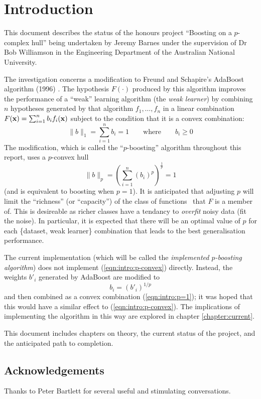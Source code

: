 

\chapter{Introduction}
\label{chapter:intro}

This document describes the status of the honours project
``Boosting on a $p$-complex hull'' being undertaken by Jeremy
Barnes under the supervision of Dr Bob Williamson in the
Engineering Department of the Australian National University.

The investigation concerns a modification to Freund and Schapire's
AdaBoost algorithm (1996) \cite{Freund96}.  The hypothesis $F(\cdot)$
produced by this algorithm improves the performance of a ``weak''
learning algorithm (the \emph{weak learner}) by combining $n$
hypotheses generated by that algorithm $f_1, \ldots, f_n$
in a linear combination $F(\mathbf{x}) = \sum_{i=1}^{n} b_i f_i(\mathbf{x})$
subject to the condition that it is a convex combination:
%
\begin{equation}
\label{eqn:intro:p=1}
\|b\|_1 = \sum_{i=1}^{n} b_i = 1 \qquad \mbox{where} \qquad b_i \geq 0
\end{equation}
%
The modification, which is called the ``$p$-boosting'' algorithm
throughout this report, uses a $p$-convex hull
%
\begin{equation}
\|b\|_p = \left( \sum_{i=1}^{n} \left(b_i\right)^p
\right)^{\frac{1}{p}} = 1
\label{eqn:intro:p-convex}
\end{equation}
%
(and is equivalent to boosting when $p=1$).  It
is anticipated that adjusting $p$ will limit the ``richness'' (or
``capacity'') of the class of functions \calF\ that $F$ is a member
of.  This is desireable as richer classes have a tendancy to
\emph{overfit} noisy data (fit the noise).  In particular, it is
expected that there will be an optimal value of $p$ for each
\{dataset, weak learner\} combination that leads to the best
generalisation performance. 

The current implementation (which will be called the \emph{implemented
$p$-boosting algorithm}) does not
implement (\ref{eqn:intro:p-convex}) directly.  Instead, the weights
$b'_i$ generated by AdaBoost are modified to
%
\begin{equation}
b_i = \left( b'_i \right) ^{1/p}
\end{equation}
%
and then combined as a convex combination (\ref{eqn:intro:p=1}); it was
hoped that this would have a similar effect to (\ref{eqn:intro:p-convex}).
The implications of implementing the algorithm in this way are
explored in chapter \ref{chapter:current}.

This document includes chapters on theory, the current status of the
project, and the anticipated path to completion.

\enlargethispage{\baselineskip}
\section*{Acknowledgements}

Thanks to Peter Bartlett for several useful and stimulating conversations.

